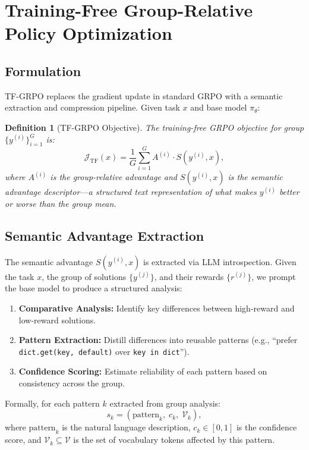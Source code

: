 \documentclass[11pt]{article}
\newtheorem{definition}{Definition}
\begin{document}
\section{Training-Free Group-Relative Policy Optimization}
\label{sec:tfgrpo}

\subsection{Formulation}

TF-GRPO replaces the gradient update in standard GRPO with a semantic
extraction and compression pipeline. Given task $x$ and base model $\pi_\theta$:

\begin{definition}[TF-GRPO Objective]
The training-free GRPO objective for group $\{y^{(i)}\}_{i=1}^G$ is:
\begin{equation}
    \mathcal{J}_{\text{TF}}(x) = \frac{1}{G} \sum_{i=1}^{G} A^{(i)} \cdot S(y^{(i)}, x),
\end{equation}
where $A^{(i)}$ is the group-relative advantage and $S(y^{(i)}, x)$ is the
semantic advantage descriptor---a structured text representation of what makes
$y^{(i)}$ better or worse than the group mean.
\end{definition}

\subsection{Semantic Advantage Extraction}

The semantic advantage $S(y^{(i)}, x)$ is extracted via LLM introspection.
Given the task $x$, the group of solutions $\{y^{(j)}\}$, and their rewards
$\{r^{(j)}\}$, we prompt the base model to produce a structured analysis:

\begin{enumerate}[leftmargin=1.5em]
    \item \textbf{Comparative Analysis:} Identify key differences between
          high-reward and low-reward solutions.
    \item \textbf{Pattern Extraction:} Distill differences into reusable
          patterns (e.g., ``prefer \texttt{dict.get(key, default)} over
          \texttt{key in dict}'').
    \item \textbf{Confidence Scoring:} Estimate reliability of each pattern
          based on consistency across the group.
\end{enumerate}

Formally, for each pattern $k$ extracted from group analysis:
\begin{equation}
    s_k = \left(\text{pattern}_k, \; c_k, \; \mathcal{V}_k\right),
\end{equation}
where $\text{pattern}_k$ is the natural language description, $c_k \in [0, 1]$
is the confidence score, and $\mathcal{V}_k \subseteq \mathcal{V}$ is the set
of vocabulary tokens affected by this pattern.
\end{document}
